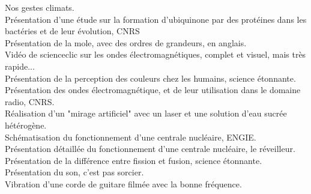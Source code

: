
{\large {}}
\bigskip

Nos gestes climats.
\\[22pt]

Présentation d'une étude sur la formation d'ubiquinone par des protéines dans les bactéries et de leur évolution, CNRS
\\[8pt]

Présentation de la mole, avec des ordres de grandeurs, en anglais.
\\[22pt]


Vidéo de scienceclic sur les ondes électromagnétiques, complet et visuel, mais très rapide...
\\[8pt]

Présentation de la perception des couleurs chez les humains, science étonnante.
\\[22pt]

Présentation des ondes électromagnétique, et de leur utilisation dans le domaine radio, CNRS.
\\[8pt]

Réalisation d'un "mirage artificiel" avec un laser et une solution d'eau sucrée hétérogène.
\\[8pt]


Schématisation du fonctionnement d'une centrale nucléaire, ENGIE.
\\[22pt]

Présentation détaillée du fonctionnement d'une centrale nucléaire, le réveilleur.
\\[8pt]

Présentation de la différence entre fission et fusion, science étonnante.
\\[22pt]


Présentation du son, c'est pas sorcier.
\\[22pt]

Vibration d'une corde de guitare filmée avec la bonne fréquence.
\\[22pt]